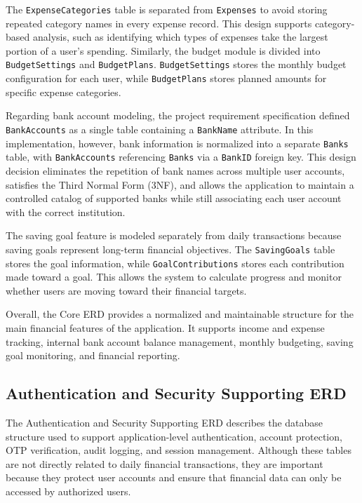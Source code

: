 \documentclass{article}
\begin{document}
The \texttt{ExpenseCategories} table is separated from \texttt{Expenses} to avoid storing repeated
category names in every expense record. This design supports category-based analysis, such as
identifying which types of expenses take the largest portion of a user's spending. Similarly,
the budget module is divided into \texttt{BudgetSettings} and \texttt{BudgetPlans}.
\texttt{BudgetSettings} stores the monthly budget configuration for each user, while
\texttt{BudgetPlans} stores planned amounts for specific expense categories.

Regarding bank account modeling, the project requirement specification defined
\texttt{BankAccounts} as a single table containing a \texttt{BankName} attribute. In this
implementation, however, bank information is normalized into a separate \texttt{Banks} table,
with \texttt{BankAccounts} referencing \texttt{Banks} via a \texttt{BankID} foreign key. This
design decision eliminates the repetition of bank names across multiple user accounts, satisfies
the Third Normal Form (3NF), and allows the application to maintain a controlled catalog of
supported banks while still associating each user account with the correct institution.

The saving goal feature is modeled separately from daily transactions because saving goals
represent long-term financial objectives. The \texttt{SavingGoals} table stores the goal
information, while \texttt{GoalContributions} stores each contribution made toward a goal. This
allows the system to calculate progress and monitor whether users are moving toward their
financial targets.

Overall, the Core ERD provides a normalized and maintainable structure for the main financial
features of the application. It supports income and expense tracking, internal bank account
balance management, monthly budgeting, saving goal monitoring, and financial reporting.

\subsection{Authentication and Security Supporting ERD}

The Authentication and Security Supporting ERD describes the database structure used to support
application-level authentication, account protection, OTP verification, audit logging, and session
management. Although these tables are not directly related to daily financial transactions, they are
important because they protect user accounts and ensure that financial data can only be accessed by
authorized users.
\end{document}
